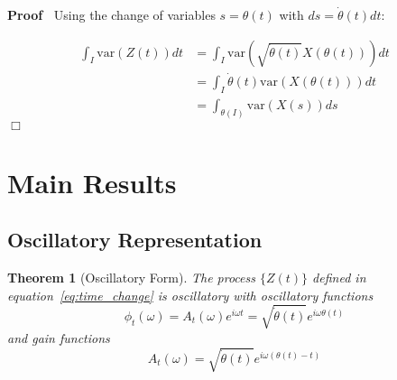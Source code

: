 \documentclass{article}
\newenvironment{proof}{\noindent\textbf{Proof\ }}{\hspace*{\fill}$\Box$\medskip}
\newtheorem{theorem}{Theorem}
\begin{document}
\begin{proof}
  Using the change of variables $s = \theta (t)$ with $ds = \dot{\theta} (t)
  dt$:
  
  \begin{align}
    \int_I \mathrm{var} (Z (t)) dt & = \int_I \mathrm{var} \left(
    \sqrt{\dot{\theta} (t)} X (\theta (t)) \right) dt \\
    & = \int_I \dot{\theta} (t) \mathrm{var} (X (\theta (t))) dt \\
    & = \int_{\theta (I)} \mathrm{var} (X (s)) ds 
  \end{align}
\end{proof}

\section{Main Results}

\subsection{Oscillatory Representation}

\begin{theorem}
  [Oscillatory Form]\label{thm:osc_rep} The process $\{Z (t)\}$ defined in
  equation~\eqref{eq:time_change} is oscillatory with oscillatory functions
  \begin{equation}
    \label{eq:phi_def} \phi_t (\omega) = A_t (\omega) e^{i \omega t} =
    \sqrt{\dot{\theta} (t)} e^{i \omega \theta (t)}
  \end{equation}
  and gain functions
  \begin{equation}
    A_t (\omega) = \sqrt{\dot{\theta} (t)} e^{i \omega (\theta (t) - t)}
  \end{equation}
\end{theorem}
\end{document}

